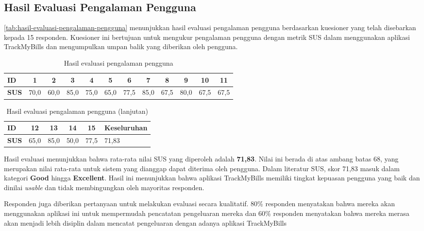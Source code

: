 \subsection{Hasil Evaluasi Pengalaman Pengguna}
\label{subsec:hasil-evaluasi-pengalaman-pengguna}

\autoref{tab:hasil-evaluasi-pengalaman-pengguna} menunjukkan hasil evaluasi pengalaman pengguna berdasarkan kuesioner yang telah disebarkan kepada 15 responden. Kuesioner ini bertujuan untuk mengukur pengalaman pengguna dengan metrik SUS dalam menggunakan aplikasi TrackMyBills dan mengumpulkan umpan balik yang diberikan oleh pengguna. 

\begin{table}[h!]
\centering
\caption{Hasil evaluasi pengalaman pengguna}
\label{tab:hasil-evaluasi-pengalaman-pengguna}
\begin{tabularx}{\linewidth}{|l|*{11}{c|}}
\hline
\textbf{ID} & 1 & 2 & 3 & 4 & 5 & 6 & 7 & 8 & 9 & 10 & 11 \\ \hline
\textbf{SUS} & 70,0 & 60,0 & 85,0 & 75,0 & 65,0 & 77,5 & 85,0 & 67,5 & 80,0 & 67,5 & 67,5 \\ \hline
\end{tabularx}
\end{table}

\begin{table}[h!]
    \ContinuedFloat
\centering
\caption{Hasil evaluasi pengalaman pengguna (lanjutan)}
\begin{tabular}{|l|*{4}{c|}l|}
\hline
\textbf{ID} & 12 & 13 & 14 & 15 & Keseluruhan \\ \hline
\textbf{SUS} & 65,0 & 85,0 & 50,0 & 77,5 & 71,83 \\ \hline
\end{tabular}
\end{table}

Hasil evaluasi menunjukkan bahwa rata-rata nilai SUS yang diperoleh adalah \textbf{71,83}. Nilai ini berada di atas ambang batas 68, yang merupakan nilai rata-rata untuk sistem yang dianggap dapat diterima oleh pengguna. Dalam literatur SUS, skor 71,83 masuk dalam kategori \textbf{Good} hingga \textbf{Excellent}. Hasil ini menunjukkan bahwa aplikasi TrackMyBills memiliki tingkat kepuasan pengguna yang baik dan dinilai \emph{usable} dan tidak membingungkan oleh mayoritas responden. 

Responden juga diberikan pertanyaan untuk melakukan evaluasi secara kualitatif. 80\% responden menyatakan bahwa mereka akan menggunakan aplikasi ini untuk mempermudah pencatatan pengeluaran mereka dan 60\% responden menyatakan bahwa mereka merasa akan menjadi lebih disiplin dalam mencatat pengeluaran dengan adanya aplikasi TrackMyBills
